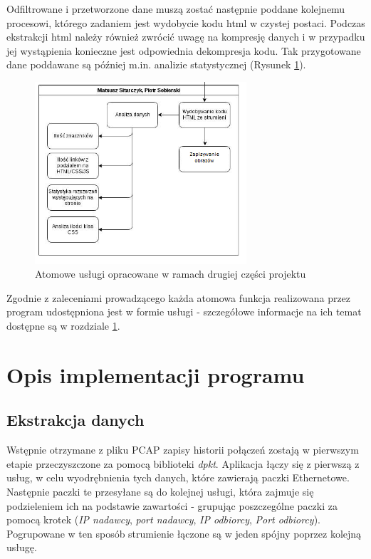\documentclass[12pt]{article}
\begin{document}
Odfiltrowane i przetworzone dane muszą zostać następnie poddane kolejnemu procesowi, którego zadaniem jest wydobycie kodu html w czystej postaci. Podczas ekstrakcji html należy również zwrócić uwagę na kompresję danych i w przypadku jej wystąpienia konieczne jest odpowiednia dekompresja kodu. 
Tak przygotowane dane poddawane są później m.in. analizie statystycznej (Rysunek \ref{img:funkcje2}). 

\begin{figure}[h]
\centering
\caption{Atomowe usługi opracowane w ramach drugiej części projektu}
\label{img:funkcje2}
\includegraphics[width=0.7\textwidth]{Wykres2.png}
\end{figure}


Zgodnie z zaleceniami prowadzącego każda atomowa funkcja realizowana przez program udostępniona jest w formie usługi - szczegółowe informacje na ich temat dostępne są w rozdziale \ref{dzialanie}. 

\section{Opis implementacji programu}
\label{dzialanie}
\subsection{Ekstrakcja danych}
Wstępnie otrzymane z pliku PCAP zapisy historii połączeń zostają w pierwszym etapie przeczyszczone za pomocą biblioteki \emph{dpkt}. Aplikacja łączy się z pierwszą z usług, w celu wyodrębnienia tych danych, które zawierają paczki Ethernetowe. Następnie paczki te przesyłane są do kolejnej usługi, która zajmuje się podzieleniem ich na podstawie zawartości - grupując poszczególne paczki za pomocą krotek (\emph{IP nadawcy}, \emph{port nadawcy}, \emph{IP odbiorcy}, \emph{Port odbiorcy}). Pogrupowane w ten sposób strumienie łączone są w jeden spójny poprzez kolejną usługę.
\end{document}
